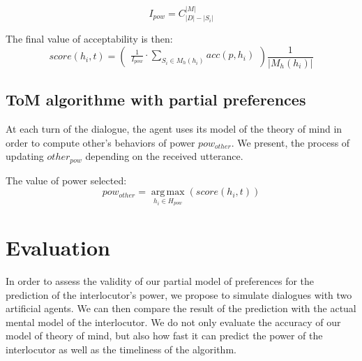 \documentclass[sigconf]{aamas}  %
\begin{document}
	$$I_{pow} =  C_{|D|-|S_i|}^{|M|}$$
	
	
	The final value of acceptability is then:
	\begin{equation}
	score(h_i, t)= \left( \begin{array}{c}  \frac{1}{I_{pow}} \cdot \sum_{S_i \in M_h(h_i) } acc(p, h_i) 
	\end{array}\right) \frac{1}{| M_h(h_i)|}
	\end{equation}
	
	\subsection{ToM algorithme with partial preferences}
	At each turn of the dialogue, the agent uses its model of the theory of mind in order to compute other's behaviors of power $pow_{other}$. We present, the process of updating $other_{pow}$ depending on the received utterance. 
	
	The value of power selected:
	\begin{equation}
	pow_{other} = \operatorname*{arg\,max}_{h_i \in H_{pow}} ( score(h_i,t))
	\end{equation}
	
	
	\section{Evaluation}
	In order to assess the validity of our partial model of preferences for the prediction of the interlocutor's power, we propose to simulate dialogues with two artificial agents. We can then compare the result of the prediction with the actual mental model of the interlocutor. We do not only evaluate the accuracy of our model of theory of mind, but also how fast it can predict the power of the interlocutor as well as the timeliness of the algorithm.
	
\end{document}
